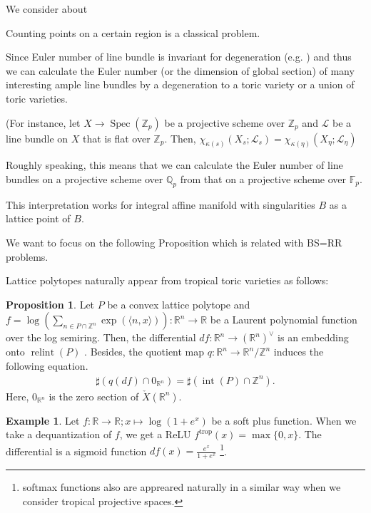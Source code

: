 \documentclass[a4paper,dvipdfmx,reqno,12pt]{amsart}
\theoremstyle{definition}
\newtheorem{Eg}[Thm]{Example}
\newtheorem{Prop}[Thm]{Proposition}
\newcommand{\R}{\mathbb{R}}%
\newcommand{\Q}{\mathbb{Q}}%
\newcommand{\Z}{\mathbb{Z}}%
\newcommand{\mb}[1]{\mathbb{#1}}%
\newcommand{\mcal}[1]{\mathcal{#1}}%
\newcommand{\opn}[1]{\operatorname{#1}}
\newcommand{\abk}[1]{\langle {#1} \rangle}%
\numberwithin{equation}{section}
\begin{document}
We consider about 

Counting points on a certain region is a classical problem.

Since Euler number of line bundle is invariant for 
degeneration (e.g. \cite[p.50]{}) and thus we can calculate
the Euler number (or the dimension of global section)
 of many interesting ample line bundles
by a degeneration to a toric variety or a union of toric
varieties. 

(For instance, let $X\to \opn{Spec}(\Z_{p})$ be a
projective scheme over $\Z_{p}$ and $\mcal{L}$
be a line bundle on $X$ that is flat over $\Z_{p}$.
Then, $\chi_{\kappa(s)}(X_s;\mcal{L}_s)=\chi_{\kappa(\eta)}(X_{\eta};\mcal{L}_{\eta})$

Roughly speaking, this means that
we can calculate the Euler number of line bundles on
a projective scheme over $\Q_p$ from that on a 
projective scheme over $\mb{F}_p$.  

This interpretation works for integral affine manifold 
with singularities $B$ as a lattice point of $B$. 

We want to focus on the following Proposition which is related with
BS=RR problems.

Lattice polytopes naturally appear from tropical toric
varieties as follows: 

\begin{Prop}
Let $P$ be a convex lattice polytope and
$f=\log (\sum_{n\in P\cap \Z^{n}} \opn{exp}(\abk{n,x}))\colon \R^{n}\to \R$ be 
a Laurent polynomial function over the log semiring. Then,
 the differential
$df:\R^{n}\to (\R^{n})^{\vee}$ is an embedding onto $\opn{relint}(P)$
\cite[p.124 Exercise]{MR1301331}.
Besides, the quotient map $q: \R^{n}\to \R^{n}/\Z^{n}$ induces the following
equation.
\begin{align}
\sharp (q(df)\cap 0_{\R^{n}})=\sharp (\opn{int}(P)\cap \Z^{n}). 
\end{align}
Here, $0_{{\R}^{n}}$ is the zero section of $\check{X}(\R^{n})$.
\end{Prop}

\begin{Eg}
Let $f:\R \to \R; x\mapsto \log (1+e^{x})$ be a soft 
plus function. When we take a dequantization of $f$,
we get a ReLU $f^{\opn{trop}}(x)=\max\{0,x\}$.
The differential is a sigmoid function 
$df(x)=\frac{e^{x}}{1+e^{x}}$ 
\footnote{softmax functions also are appreared 
naturally in a similar way when we consider tropical projective spaces.}.
\end{Eg}
\end{document}
